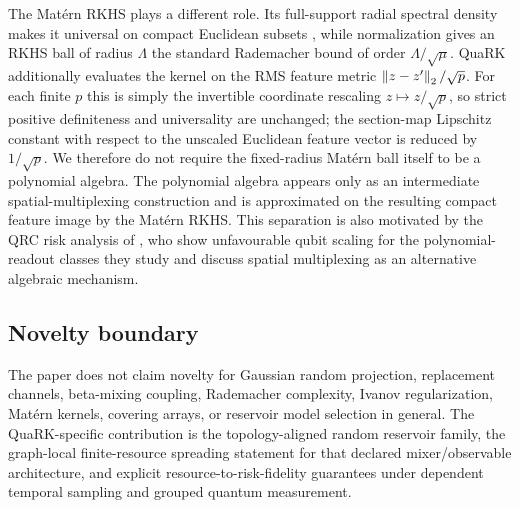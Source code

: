 The Mat\'ern RKHS plays a different role. Its full-support radial spectral
density makes it universal on compact Euclidean subsets
\citep{SriperumbudurEtAl2011}, while normalization gives an RKHS ball of
radius $\Lambda$ the standard Rademacher bound of order
$\Lambda/\sqrt{\mu}$.  QuaRK additionally evaluates the kernel on the RMS
feature metric $\left\lVert z-z'\right\rVert_2/\sqrt p$.  For each finite $p$ this is simply the
invertible coordinate rescaling $z\mapsto z/\sqrt p$, so strict positive
definiteness and universality are unchanged; the section-map Lipschitz constant
with respect to the unscaled Euclidean feature vector is reduced by
$1/\sqrt p$.  We therefore do not require the fixed-radius Mat\'ern
ball itself to be a polynomial algebra. The polynomial algebra appears only
as an intermediate spatial-multiplexing construction and is approximated on
the resulting compact feature image by the Mat\'ern RKHS. This separation is
also motivated by the QRC risk analysis of \citet{ChmielewskiEtAl2025}, who
show unfavourable qubit scaling for the polynomial-readout classes they study
and discuss spatial multiplexing as an alternative algebraic mechanism.

\subsection{Novelty boundary}

The paper does not claim novelty for Gaussian random projection, replacement
channels, beta-mixing coupling, Rademacher complexity, Ivanov regularization,
Mat\'ern kernels, covering arrays, or reservoir model selection in general.
The QuaRK-specific contribution is the topology-aligned random reservoir
family, the graph-local finite-resource spreading statement for that declared
mixer/observable architecture, and explicit resource-to-risk-fidelity
guarantees under dependent temporal sampling and grouped quantum measurement.
